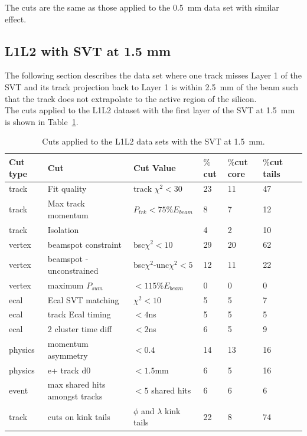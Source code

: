 The cuts are the same as those applied to the 0.5~mm data set with similar effect.

\subsection{L1L2 with SVT at 1.5 mm}
The following section describes the data set where one track misses Layer 1 of the SVT and its track projection back to Layer 1 is within 2.5~mm of the beam such that the track does not extrapolate to the active region of the silicon.\\
\indent The cuts applied to the L1L2 dataset with the first layer of the SVT at 1.5~mm is shown in Table~\ref{l1l2_cuts_1p5}.

\begin{table}[H]
\caption{Cuts applied to the L1L2 data sets with the SVT at 1.5~mm.}
\label{l1l2_cuts_1p5}
\centering
\begin{tabular}{lllllll}
\toprule
Cut type & Cut & Cut Value &  $\%$cut &  $\%$cut core & $\%$cut tails\\
\midrule
track & Fit quality & track $\chi^{2}<30$ & 23 & 11 & 47 \\
track & Max track momentum &  $P_{trk}<75\%E_{beam}$ & 8 & 7 & 12 \\
track & Isolation &   & 4 & 2 & 10 \\
vertex & beamspot constraint & bsc$\chi^{2}<10$  & 29 & 20 & 62 \\
vertex & beamspot - unconstrained & bsc$\chi^{2}$-unc$\chi^2<5$  & 12 & 11 & 22 \\
vertex & maximum $P_{sum}$ &  $<115\%E_{beam}$ & 0 & 0 & 0 \\
ecal & Ecal SVT matching & $\chi^2<10$  & 5 & 5 & 7 \\
ecal & track Ecal timing & $<4$ns  & 5 & 5 & 5 \\
ecal & 2 cluster time diff & $<2$ns  & 6 & 5 & 9 \\
physics & momentum asymmetry & $<0.4$  & 14 & 13 & 16 \\
physics & e+ track d0 & $<1.5$mm  & 6 & 5 & 16 \\
event & max shared hits amongst tracks & $<5$ shared hits  & 6 & 6 & 6 \\
track & cuts on kink tails & $\phi$ and $\lambda$ kink tails & 22 & 8 & 74 \\
\bottomrule
\end{tabular}
\end{table}

